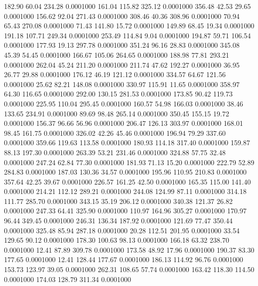  182.90   60.04  234.28   0.0001000
 161.04  115.82  325.12   0.0001000
 356.48   42.53   29.65   0.0001000
 156.62   92.04  271.43   0.0001000
 308.46   40.36  308.96   0.0001000
  70.94   65.43  270.08   0.0001000
  71.43  141.80   15.72   0.0001000
 149.89   68.45   19.34   0.0001000
 191.18  107.71  249.34   0.0001000
 253.49  114.84    9.04   0.0001000
 194.87   59.71  106.54   0.0001000
 177.93   19.13  297.78   0.0001000
 351.24   96.16   28.83   0.0001000
 345.08   45.39   54.45   0.0001000
 166.67  105.06  264.65   0.0001000
 188.98   77.81  293.21   0.0001000
 262.04   45.24  211.20   0.0001000
 211.74   47.62  192.27   0.0001000
  36.95   26.77   29.88   0.0001000
 176.12   46.19  121.12   0.0001000
 334.57   64.67  121.56   0.0001000
  25.62   82.21  148.08   0.0001000
 330.97  115.91   11.65   0.0001000
 358.97   64.30  116.65   0.0001000
 292.00  130.15  281.53   0.0001000
 173.85   90.42  119.73   0.0001000
 225.95  110.04  295.45   0.0001000
 160.57   54.98  166.03   0.0001000
  38.46  133.65  234.91   0.0001000
  89.69   98.48  265.14   0.0001000
 350.45  155.15   19.72   0.0001000
 156.37   96.66   56.96   0.0001000
 206.47  126.13  303.97   0.0001000
 168.01   98.45  161.75   0.0001000
 326.02   42.26   45.46   0.0001000
 196.94   79.29  337.60   0.0001000
 359.66  119.63  113.58   0.0001000
 180.93  114.18  317.40   0.0001000
 159.87   88.13  197.30   0.0001000
 263.39   53.21  231.46   0.0001000
 324.88   57.75   32.48   0.0001000
 247.24   62.84   77.30   0.0001000
 181.93   71.13   15.20   0.0001000
 222.79   52.89  284.83   0.0001000
 187.03  130.36   34.57   0.0001000
 195.96  110.95  210.83   0.0001000
 357.64   42.25   39.67   0.0001000
 226.57  161.25   42.50   0.0001000
 165.35  115.00  141.40   0.0001000
 214.21  112.12  289.21   0.0001000
 244.08  124.99   87.11   0.0001000
 314.18  111.77  285.70   0.0001000
 343.15   35.19  206.12   0.0001000
 340.38  121.37   26.82   0.0001000
 247.33   64.41  325.90   0.0001000
 110.97  164.96  305.27   0.0001000
 170.97   96.44  349.45   0.0001000
 246.31  136.34  187.92   0.0001000
 121.69   77.47  350.44   0.0001000
 325.48   85.94  287.18   0.0001000
  20.28  112.51  201.95   0.0001000
  33.54  129.65   90.12   0.0001000
 178.30  100.63   98.13   0.0001000
 166.18   63.32  238.70   0.0001000
  12.41   87.89  309.78   0.0001000
 173.58   48.92   17.96   0.0001000
 190.37   83.30  177.65   0.0001000
  12.41  128.44  177.67   0.0001000
 186.13  114.92   96.76   0.0001000
 153.73  123.97   39.05   0.0001000
 262.31  108.65   57.74   0.0001000
 163.42  118.30  114.50   0.0001000
 174.03  128.79  311.34   0.0001000
